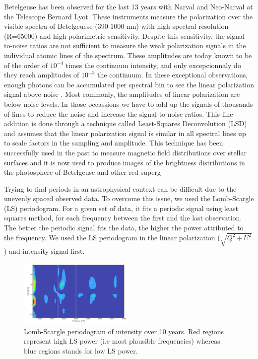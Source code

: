 \documentclass{aa}
\begin{document}
Betelgeuse has been observed for the last 13 years with Narval and Neo-Narval at the Telescope Bernard Lyot. These instruments measure the polarization 
over the visible spectra of Betelgeuese (390-1000 nm) with high spectral resolution (R=65000) and high polarimetric sensitivity. Despite 
this sensitivity, the signal-to-noise ratios are not sufficient to measure the weak polarization signals in the individual atomic lines of the 
spectrum. These amplitudes are today known to be of the order of $10^{-4}$ times the continuum intensity, and only excepcionnaly do they 
reach amplitudes of $10^{-3}$ the continuum. In these exceptional observations, enough photons can be accumulated per spectral bin to 
see the linear polarization signal above noise \cite{Auriere}. Most commonly, the amplitudes of linear polarization are below noise levels. In those 
occassions we have to add up the signals of thousands of lines to reduce the noise and increase the signal-to-noise ratios. This line addition 
is done through a technique called Least-Squares Deconvolution (LSD) \cite{Donati} and assumes that the linear polarization signal is similar 
in all spectral lines up to scale factors in the sampling and amplitude. This technique has been successfully used in the past to measure 
magnetic field distributions over stellar surfaces and it is now used to produce images of the brightness distributions in the photosphere 
of Betelgeuse and other red superg


Trying to find periods in an astrophysical context can be difficult due to the unevenly spaced observed data. To overcome this issue, 
we used the Lomb-Scargle (LS) periodogram. For a given set of data, it fits a periodic signal using least squares method, for each frequency 
between the first and the last observation. The better the periodic signal fits the data, the higher the power attributed to the frequency. 
We used the LS periodogram in the linear polarization ($\sqrt{Q^2+U^2}$) and intensity signal first. 

\begin{figure}[!h]
    \centering
    \includegraphics[width=0.5\textwidth]{LS Intensity.png}
    \caption{Lomb-Scargle periodogram of intensity over 10 years. Red regions represent high LS power (i.e most plausible frequencies) whereas blue regions stands for low LS power. }
    \label{LS Intensity}
\end{figure}
\end{document}
